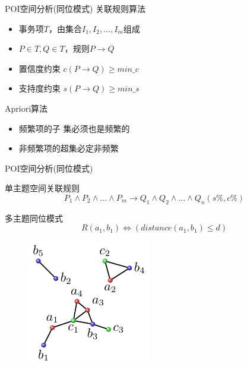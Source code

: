 \begin{frame}[c]{POI空间分析(同位模式)}
    \alert{关联规则算法}

    \vspace{1em}
    \begin{itemize}
        \item 事务项$T$，由集合$I_1,I_2,\ldots,I_m$组成
        \item $P \in T, Q \in T$，规则$P \rightarrow Q$
        \item 置信度约束 $c(P \rightarrow Q) \ge min\_c$
        \item 支持度约束 $s(P \rightarrow Q) \ge min\_s$
    \end{itemize}

    \pause
    \vspace{1em}
    \alert{Apriori算法}

    \begin{itemize}
        \item 频繁项的子 集必须也是频繁的
        \item 非频繁项的超集必定非频繁
    \end{itemize}
\end{frame}

\begin{frame}[t]{POI空间分析(同位模式)}

    \begin{alert}{单主题空间关联规则}
     \begin{equation}
        P_1\wedge P_2\wedge \ldots \wedge P_m \rightarrow Q_1\wedge Q_2\wedge \ldots \wedge Q_n(s\%, c\%)
    \end{equation}
    \end{alert}
    
    \pause
    \begin{alert}{多主题同位模式}
            \begin{equation}
                R(a_1,b_1) \Leftrightarrow (distance(a_1,b_1)\le d)
            \end{equation}

            \pause
            \begin{figure}
                \centering
                \includegraphics[scale=1.0]{figures/spatialrelation.pdf}
            \end{figure}
    \end{alert}

\end{frame}

